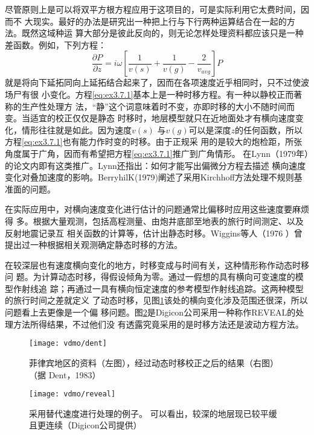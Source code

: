 尽管原则上是可以将双平方根方程应用于这项目的，可是实际利用它太费时间，因而不
大现实。最好的办法是研究出一种把上行与下行两种运算结合在一起的方法。既然这域种运
算大部分是彼此反向的，则无论怎样处理资料都应该只是一种差函数。例如，下列方程：
\begin{equation}
\frac{\partial P}{\partial z}=i\omega[\frac{1}{v(s)}+\frac{1}{v(g)}-\frac{2}{v_{avg}}]P
\label{eq:ex3.7.1}
\end{equation}
就是将向下延拓同向上延拓结合起来了，因而在各项速度近乎相同时，只不过使波场尸有很
小变化。方程\ref{eq:ex3.7.1}基本上是一种时移方程。有一种以静校正而著称的生产性处理方
法，“静”这个词意味着时不变，亦即时移的大小不随时间而变。当适宜的校正仅仅是静态
时移时，地层模型就只在近地面处才有横向速度变化，情形往往就是如此。因为速度$v(s)$
与$v(g)$可以是深度$z$的任何函数，所以方程\ref{eq:ex3.7.1}也有能力作时变的时移。由于正规采
用的是较大的炮检距，所张角度属于广角，因而有希望把方程\ref{eq:ex3.7.1}推广到广角情形。
在Lynn（1979年）的论文内即有这类推广。Lynn还指出：如何才能写出偏微分方程去描述
横向速度变化对叠加速度的影响。BerryhilK(1979)阐述了采用Kirchhoff方法处理不规则基准面的问题。

在实际应用中，对横向速度变化进行估计的问题通常比偏移时应用这些速度要麻烦得
多。根据大量观测，包括高程测量、由炮井底部至地表的旅行时间测定、以及反射地震记录互
相关函数的计算等，估计出静态时移。Wiggins等人（1976
）曾提出过一种根据相关观测确定静态时移的方法。

在较深层也有速度横向变化的地方，时移变成与时间有关，这种情形称作动态时移问
题。为计算动态时移，得假设倾角为零。通过一假想的具有横向可变速度的模型作射线追
踪；再通过一具有横向恒定速度的参考模型作射线追踪。这两种模型的旅行时间之差就定义
了动态时移，见图\ref{fig:vdmo/dent}该处的横向变化涉及范围还很深，所以问题看上去更像是一个偏
移问题。图\ref{fig:vdmo/reveal}是Digicon公司采用一种称作REVEAL的处理方法所得结果，不过他们没
有透露究竟采用的是时移方法还是波动方程方法。

\begin{figure}[H]
\centering
\texttt{[image: vdmo/dent]}
\caption[dent]{菲律宾地区的资料（左图），经过动态时移校正之后的结果（右图）（据 Dent，1983）}
\label{fig:vdmo/dent}
\end{figure}

\begin{figure}[H]
\centering
\texttt{[image: vdmo/reveal]}
\caption[reveal]{采用替代速度进行处理的例子。
可以看出，较深的地层现已较平缓且更连续（Digicon公司提供）}
\label{fig:vdmo/reveal}
\end{figure}

